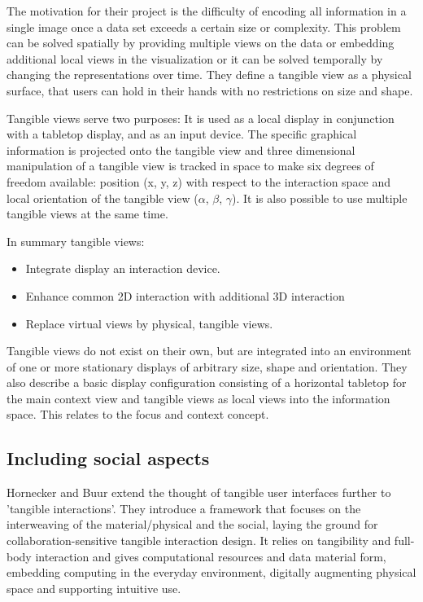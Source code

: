 The motivation for their project is the difficulty of encoding all information in a single image once a data set exceeds a certain size or complexity. This problem can be solved spatially by providing multiple views on the data or embedding additional local views in the visualization or it can be solved temporally by changing the representations over time. They define a tangible view as a physical surface, that users can hold in their hands with no restrictions on size and shape.
 
Tangible views serve two purposes: It is used as a local display in conjunction with a tabletop display, and as an input device. The specific graphical information is projected onto the tangible view and three dimensional manipulation of a tangible view is tracked in space to make six degrees of freedom available: position (x, y, z) with respect to the interaction space and local orientation of the tangible view ($\alpha$, $\beta$, $\gamma$). It is also possible to use multiple tangible views at the same time. 

In summary tangible views:
\begin{itemize}
\item Integrate display an interaction device.
\item Enhance common 2D interaction with additional 3D interaction
\item Replace virtual views by physical, tangible views.
\end{itemize}

Tangible views do not exist on their own, but are integrated into an environment of one or more stationary displays of arbitrary size, shape and orientation. 
They also describe a basic display configuration consisting of a horizontal tabletop for the main context view and tangible views as local views into the information space. This relates to the focus and context concept.




\subsection{Including social aspects}
Hornecker and Buur \cite{hornecker06} extend the thought of tangible user interfaces further to 'tangible interactions'. They introduce a framework that focuses on the interweaving of the material/physical and the social, laying the ground for collaboration-sensitive tangible interaction design. It relies on tangibility and full-body interaction and gives computational resources and data material form, embedding computing in the everyday environment, digitally augmenting physical space and supporting intuitive use. 

